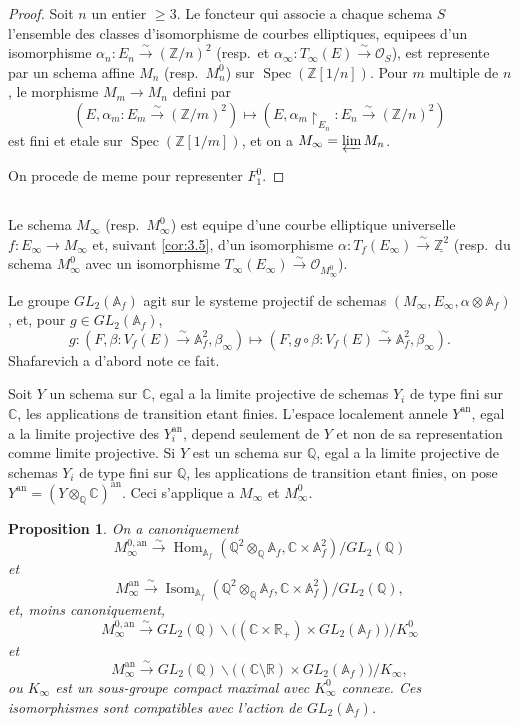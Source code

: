 \documentclass[11pt,reqno]{amsart}
\theoremstyle{plain}
\newtheorem{proposition}[theorem]{Proposition}
\theoremstyle{remark}
\DeclareMathOperator{\Isom}{Isom}
\DeclareMathOperator{\Hom}{Hom}
\DeclareMathOperator{\Spec}{Spec}
\newcommand{\shO}{\mathcal{O}}
\newcommand{\Z}{\mathbb{Z}}
\newcommand{\Q}{\mathbb{Q}}
\newcommand{\R}{\mathbb{R}}
\newcommand{\C}{\mathbb{C}}
\newcommand{\A}{\mathbb{A}}
\newcommand{\isom}{\xrightarrow{\sim}}
\numberwithin{equation}{section}
\begin{document}
\begin{proof}
Soit $n$ un entier $\geq 3$. Le foncteur qui associe a chaque schema $S$ l'ensemble des classes d'isomorphisme de courbes elliptiques, equipees d'un isomorphisme $\alpha_n: E_n \isom (\Z/n)^2$ (resp.~et $\alpha_\infty: T_\infty(E) \isom \shO_S$), est represente par un schema affine $M_n$ (resp.~$M_n^0$) sur $\Spec(\Z[1/n])$. Pour $m$ multiple de $n$, le morphisme $M_m \to M_n$ defini par
\[
(E, \alpha_m: E_m \isom (\Z/m)^2) \mapsto (E, \alpha_m \restriction_{E_n}: E_n \isom (\Z/n)^2)
\]
est fini et etale sur $\Spec(\Z[1/m])$, et on a $M_\infty = \varprojlim M_n$.

On procede de meme pour representer $F_1^0$.
\end{proof}

\subsection{}\label{subsec:3.7}

Le schema $M_\infty$ (resp.~$M_\infty^0$) est equipe d'une courbe elliptique universelle $f: E_\infty \to M_\infty$ et, suivant \ref{cor:3.5}, d'un isomorphisme $\alpha: T_f(E_\infty) \isom \underline{\Z^2}$ (resp.~du schema $M_\infty^0$ avec un isomorphisme $T_\infty(E_\infty) \isom \shO_{M_\infty^0}$).

Le groupe $GL_2(\A_f)$ agit sur le systeme projectif de schemas $(M_\infty, E_\infty, \alpha \otimes \A_f)$, et, pour $g \in GL_2(\A_f)$,
\[
g: (F, \beta: V_f(E) \isom \A_f^2, \beta_\infty) \mapsto (F, g \circ \beta: V_f(E) \isom \A_f^2, \beta_\infty).
\]
Shafarevich a d'abord note ce fait.

Soit $Y$ un schema sur $\C$, egal a la limite projective de schemas $Y_i$ de type fini sur $\C$, les applications de transition etant finies. L'espace localement annele $Y^{\text{an}}$, egal a la limite projective des $Y_i^{\text{an}}$, depend seulement de $Y$ et non de sa representation comme limite projective. Si $Y$ est un schema sur $\Q$, egal a la limite projective de schemas $Y_i$ de type fini sur $\Q$, les applications de transition etant finies, on pose $Y^{\text{an}} = (Y \otimes_\Q \C)^{\text{an}}$. Ceci s'applique a $M_\infty$ et $M_\infty^0$.

\begin{proposition}\label{prop:3.8}
On a canoniquement
\[
M_\infty^{0,\text{an}} \isom \Hom_{\A_f}(\Q^2 \otimes_\Q \A_f, \C \times \A_f^2) / GL_2(\Q)
\]
et
\[
M_\infty^{\text{an}} \isom \Isom_{\A_f}(\Q^2 \otimes_\Q \A_f, \C \times \A_f^2) / GL_2(\Q),
\]
et, moins canoniquement,
\[
M_\infty^{0,\text{an}} \isom GL_2(\Q) \backslash \bigl((\C \times \R_+) \times GL_2(\A_f)\bigr) / K_\infty^0
\]
et
\[
M_\infty^{\text{an}} \isom GL_2(\Q) \backslash \bigl((\C \setminus \R) \times GL_2(\A_f)\bigr) / K_\infty,
\]
ou $K_\infty$ est un sous-groupe compact maximal avec $K_\infty^0$ connexe. Ces isomorphismes sont compatibles avec l'action de $GL_2(\A_f)$.
\end{proposition}
\end{document}
